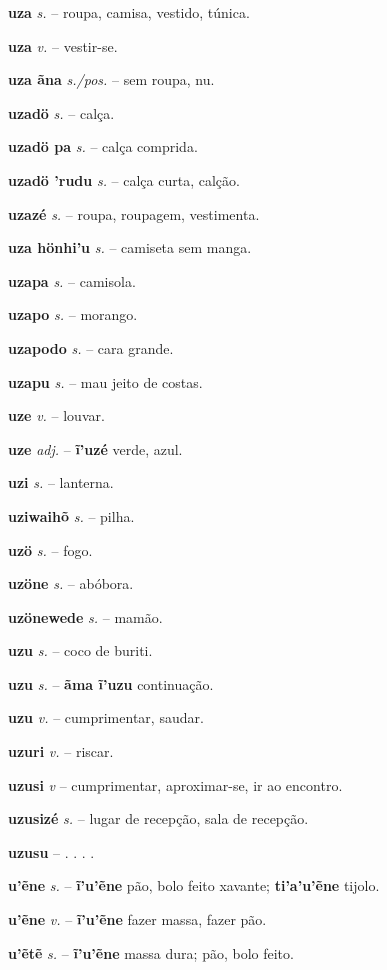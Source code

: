 \textbf{uza} \textit{s.} -- roupa, camisa, vestido, túnica.

\textbf{uza} \textit{v.} -- vestir-se.

\textbf{uza ãna} \textit{s./pos.} -- sem roupa, nu.

\textbf{uzadö} \textit{s.} -- calça.

\textbf{uzadö pa} \textit{s.} -- calça comprida.

\textbf{uzadö 'rudu} \textit{s.} -- calça curta, calção.

\textbf{uzazé} \textit{s.} -- roupa, roupagem, vestimenta.

\textbf{uza hönhi'u} \textit{s.} -- camiseta sem manga.

\textbf{uzapa} \textit{s.} -- camisola.

\textbf{uzapo} \textit{s.} -- morango.

\textbf{uzapodo} \textit{s.} -- cara grande.

\textbf{uzapu} \textit{s.} -- mau jeito de costas.

\textbf{uze} \textit{v.} -- louvar.

\textbf{uze} \textit{adj.} -- \textbf{ĩ'uzé} verde, azul.

\textbf{uzi} \textit{s.} -- lanterna.

\textbf{uziwaihõ} \textit{s.} -- pilha.

\textbf{uzö} \textit{s.} -- fogo.

\textbf{uzöne} \textit{s.} -- abóbora.

\textbf{uzönewede} \textit{s.} -- mamão.

\textbf{uzu} \textit{s.} -- coco de buriti.

\textbf{uzu} \textit{s.} -- \textbf{ãma ĩ'uzu} continuação.

\textbf{uzu} \textit{v.} -- cumprimentar, saudar.

\textbf{uzuri} \textit{v.} -- riscar.

\textbf{uzusi} \textit{v} -- cumprimentar, aproximar-se, ir ao encontro.

\textbf{uzusizé} \textit{s.} -- lugar de recepção, sala de recepção.

\textbf{uzusu} \textit{} -- . . . .

\textbf{u'ẽne} \textit{s.} -- \textbf{ĩ'u'ẽne} pão, bolo feito xavante; \textbf{ti'a'u'ẽne} tijolo.

\textbf{u'ẽne} \textit{v.} -- \textbf{ĩ'u'ẽne} fazer massa, fazer pão.

\textbf{u'ẽtẽ} \textit{s.} -- \textbf{ĩ'u'ẽne} massa dura; pão, bolo feito.

